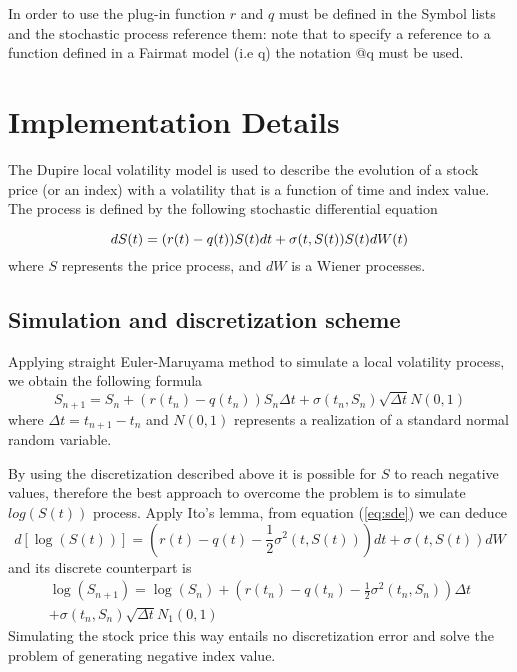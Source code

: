 In order to use the plug-in function $r$ and $q$ must be defined in the Symbol lists and the stochastic process reference them: note that to specify a reference to a function defined in a Fairmat model (i.e {\ttfamily q}) the notation {\ttfamily @q} must be used. 

\section{Implementation Details}

The Dupire local volatility model is used to describe the evolution of a stock price (or an index) with a volatility that is a function of time and index value. The process is defined by the following stochastic differential equation

\begin{equation}
dS(t) = (r(t)-q(t)) S(t)dt + \sigma(t,S(t))S(t)dW(t)\label{eq:sde}\\
\end{equation}
where $S$ represents the price process, and $dW$ is a Wiener processes.

\subsection{Simulation and discretization scheme}

Applying straight Euler-Maruyama method to simulate a local volatility process, we obtain the following formula
\begin{equation}
S_{n+1} = S_n + (r(t_n) - q(t_n))S_n\Delta t + \sigma(t_n,S_n)\sqrt{\Delta t} N(0,1)
\end{equation}
where $\Delta t = t_{n+1}-t_n$ and $N(0,1)$ represents a realization of a standard normal random variable. 

By using the discretization described above it is possible for $S$ to reach negative values, therefore  the best approach to overcome the problem is to simulate $log(S(t))$ process. Apply Ito's lemma, from equation (\ref{eq:sde}) we can deduce
\begin{equation}
d\left[\log\left(S(t)\right)\right] = \left(r(t) - q(t)- \frac{1}{2}\sigma^2(t, S(t)) \right)dt + \sigma(t, S(t))dW %
\end{equation}
and its discrete counterpart is
\begin{align}
\log(S_{n+1}) = \log(S_n) + \left(r(t_n) - q(t_n) - \frac{1}{2}\sigma^2(t_n, S_n) \right)\Delta t\nonumber\\
 + \sigma(t_n, S_n)\sqrt{\Delta t} N_1(0,1)
\end{align}
Simulating the stock price this way entails no discretization error and solve the problem of generating negative index value.

